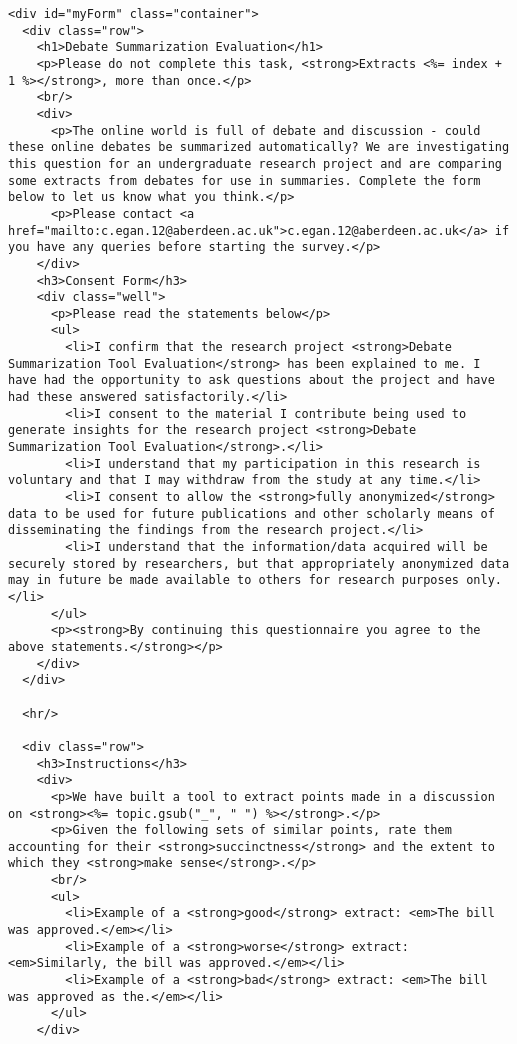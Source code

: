 \documentclass{article}
\begin{document}
\begin{verbatim}
<div id="myForm" class="container">
  <div class="row">
    <h1>Debate Summarization Evaluation</h1>
    <p>Please do not complete this task, <strong>Extracts <%= index + 1 %></strong>, more than once.</p>
    <br/>
    <div>
      <p>The online world is full of debate and discussion - could these online debates be summarized automatically? We are investigating this question for an undergraduate research project and are comparing some extracts from debates for use in summaries. Complete the form below to let us know what you think.</p>
      <p>Please contact <a href="mailto:c.egan.12@aberdeen.ac.uk">c.egan.12@aberdeen.ac.uk</a> if you have any queries before starting the survey.</p>
    </div>
    <h3>Consent Form</h3>
    <div class="well">
      <p>Please read the statements below</p>
      <ul>
        <li>I confirm that the research project <strong>Debate Summarization Tool Evaluation</strong> has been explained to me. I have had the opportunity to ask questions about the project and have had these answered satisfactorily.</li>
        <li>I consent to the material I contribute being used to generate insights for the research project <strong>Debate Summarization Tool Evaluation</strong>.</li>
        <li>I understand that my participation in this research is voluntary and that I may withdraw from the study at any time.</li>
        <li>I consent to allow the <strong>fully anonymized</strong> data to be used for future publications and other scholarly means of disseminating the findings from the research project.</li>
        <li>I understand that the information/data acquired will be securely stored by researchers, but that appropriately anonymized data may in future be made available to others for research purposes only.</li>
      </ul>
      <p><strong>By continuing this questionnaire you agree to the above statements.</strong></p>
    </div>
  </div>

  <hr/>

  <div class="row">
    <h3>Instructions</h3>
    <div>
      <p>We have built a tool to extract points made in a discussion on <strong><%= topic.gsub("_", " ") %></strong>.</p>
      <p>Given the following sets of similar points, rate them accounting for their <strong>succinctness</strong> and the extent to which they <strong>make sense</strong>.</p>
      <br/>
      <ul>
        <li>Example of a <strong>good</strong> extract: <em>The bill was approved.</em></li>
        <li>Example of a <strong>worse</strong> extract: <em>Similarly, the bill was approved.</em></li>
        <li>Example of a <strong>bad</strong> extract: <em>The bill was approved as the.</em></li>
      </ul>
    </div>


\end{verbatim}
\end{document}
